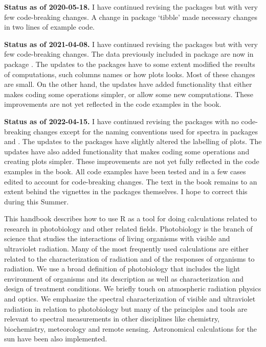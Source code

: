 \begin{shaded}
\noindent
\textbf{Status as of 2020-05-18.} I have continued revising the packages but with very few code-breaking changes. A change in package `tibble' made necessary changes in two lines of example code.
\end{shaded}

\begin{shaded}
\noindent
\textbf{Status as of 2021-04-08.} I have continued revising the packages but with very few code-breaking changes. The data previously included in package  are now in package . The updates to the packages have to some extent modified the results of computations, such columns names or how plots looks. Most of these changes are small. On the other hand, the updates have added functionality that either makes coding some operations simpler, or allow some new computations. These improvements are not yet reflected in the code examples in the book.
\end{shaded}

\begin{shaded}
\noindent
\textbf{Status as of 2022-04-15.} I have continued revising the packages with no code-breaking changes except for the naming conventions used for spectra in packages  and . The updates to the packages have slightly altered the labelling of plots. The updates have also added functionality that makes coding some operations and creating plots simpler. These improvements are not yet fully reflected in the code examples in the book. All code examples have been tested and in a few cases edited to account for code-breaking changes. The text in the book remains to an extent behind the vignettes in the packages themselves. I hope to correct this during this Summer.
\end{shaded}

This handbook describes how to use R as a tool for doing calculations related to research in photobiology and other related fields. Photobiology is the branch of science that studies the interactions of living organisms with visible and ultraviolet radiation. Many of the most frequently used calculations are either related to the characterization of radiation and of the responses of organisms to radiation. We use a broad definition of photobiology that includes the light environment of organisms and its description as well as characterization and design of treatment conditions. We briefly touch on atmospheric radiation physics and optics. We emphasize the spectral characterization of visible and ultraviolet radiation in relation to photobiology but many of the principles and tools are relevant to spectral measurements in other disciplines like chemistry, biochemistry, meteorology and remote sensing. Astronomical calculations for the sun have been also implemented.

